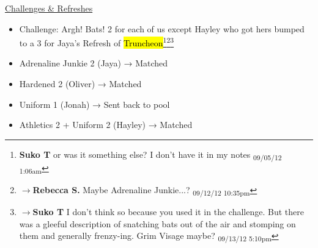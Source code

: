 \underline{  {\LARGE Challenges \& Refreshes }  }



\begin{itemize}
\item Challenge: Argh!  Bats! 2 for each of us except Hayley who got hers bumped to a 3 for Jaya's Refresh of \hl{Truncheon}\footnote{\textbf{Suko T }or was it something else?  I don't have it in my notes \textsubscript{09/05/12 1:06am}}\footnote{$\rightarrow$\textbf{Rebecca S. }Maybe Adrenaline Junkie...? \textsubscript{09/12/12 10:35pm}}\footnote{$\rightarrow$\textbf{Suko T }I don't think so because you used it in the challenge.  But there was a gleeful description of snatching bats out of the air and stomping on them and generally frenzy-ing.  Grim Visage maybe? \textsubscript{09/13/12 5:10pm}}
\end{itemize}

\begin{itemize}
\item Adrenaline Junkie 2 (Jaya) → Matched
\item Hardened 2 (Oliver) → Matched
\item Uniform 1 (Jonah) → Sent back to pool
\item Athletics 2 + Uniform 2 (Hayley) → Matched
\end{itemize}

